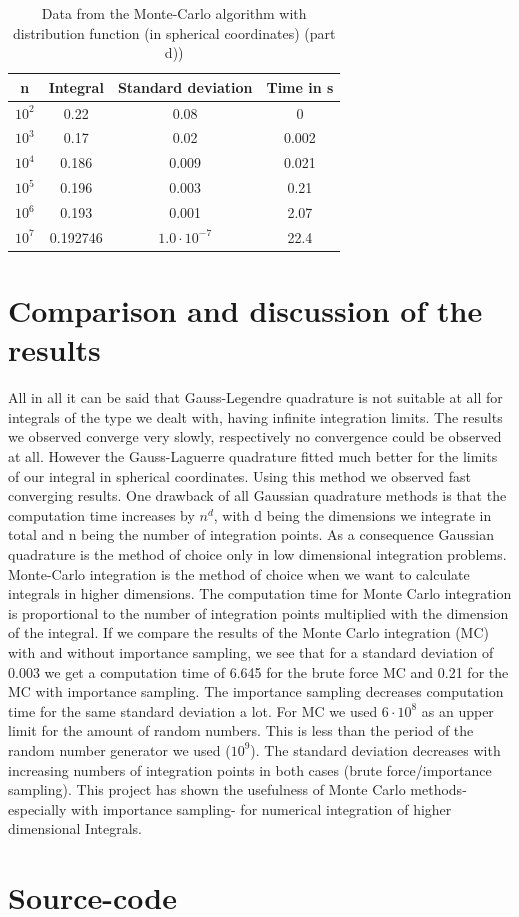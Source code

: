 \documentclass[10pt,a4paper]{article}
\begin{document}
\begin{table}[h]
\centering
\caption{Data from the Monte-Carlo algorithm with distribution function (in spherical coordinates) (part d))}
\label{Data from the  montecarlo algorithm (part d))}
\begin{tabular}{c|c|c|c}
n & Integral & Standard deviation & Time in s \\
\hline\hline
$10^2$ & 0.22 & 0.08 & 0 \\
$10^3$ & 0.17 & 0.02 & 0.002 \\
$10^4$ & 0.186 & 0.009 & 0.021 \\
$10^5$ & 0.196 & 0.003 & 0.21 \\
$10^6$ & 0.193 & 0.001 & 2.07 \\
$10^7$ & 0.192746 & $1.0 \cdot 10^{-7}$ & 22.4
\end{tabular}
\end{table}

\section{Comparison and discussion of the results}

All in all it can be said that Gauss-Legendre quadrature is not suitable at all for integrals of the type we dealt with, having infinite integration limits. The results we observed converge very slowly, respectively no convergence could be observed at all. However the Gauss-Laguerre quadrature fitted much better for the limits of our integral in spherical coordinates. Using this method we observed fast converging results. One drawback of all Gaussian quadrature methods is that the computation time increases by $n^d$, with d being the dimensions we integrate in total and n being the number of integration points. As a consequence Gaussian quadrature is the method of choice only in low dimensional integration problems.
Monte-Carlo integration is the method of choice when we want to calculate integrals in higher dimensions. The computation time for Monte Carlo integration is proportional to the number of integration points multiplied with the dimension of the integral. If we compare the results of the Monte Carlo integration (MC) with and without importance sampling, we see that for a standard deviation of 0.003 we get a computation time of 6.645 for the brute force MC and 0.21 for the MC with importance sampling. The importance sampling decreases computation time for the same standard deviation a lot. For MC we used $6 \cdot 10^{8}$ as an upper limit for the amount of random numbers. This is less than the period of the random number generator we used ($10^{9}$). The standard deviation decreases with increasing numbers of integration points in both cases (brute force/importance sampling). This project has shown the usefulness of Monte Carlo methods- especially with importance sampling- for numerical integration of higher dimensional Integrals. 



\section{Source-code}
\end{document}
